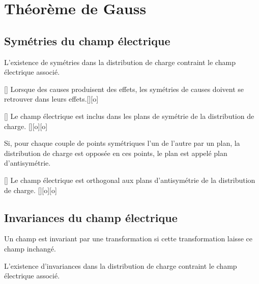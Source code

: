\section{Théorème de Gauss}

\subsection{Symétries du champ électrique}

L'existence de symétries dans la distribution de charge contraint le champ électrique associé.

[]
{Lorsque des causes produisent des effets, les symétries de causes doivent se retrouver dans leurs effets.}[][o]

[]
{Le champ électrique est inclus dans les plans de symétrie de la distribution de charge.}
[][o][o]



Si, pour chaque couple de points symétriques l'un de l'autre par un plan, la distribution de charge est opposée en ces points, le plan est appelé plan d'antisymétrie.

[]
{Le champ électrique est orthogonal aux plans d'antisymétrie de la distribution de charge.}
[][o][o]



\subsection{Invariances du champ électrique}

Un champ est invariant par une transformation si cette transformation laisse ce champ inchangé.

L'existence d'invariances dans la distribution de charge contraint le champ électrique associé.

